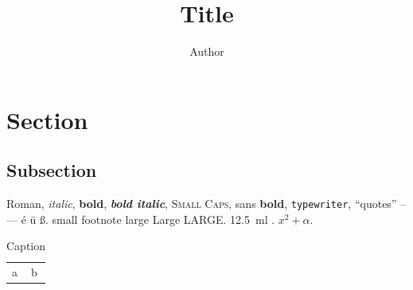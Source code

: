 \documentclass[11pt,a4paper]{article}
\title{Title}
\author{Author}
\begin{document}
\maketitle
\section{Section}\subsection{Subsection}
Roman, \textit{italic}, \textbf{bold}, \textbf{\textit{bold italic}}, \textsc{Small Caps},
\textsf{sans \textbf{bold}}, \texttt{typewriter}, ``quotes'' -- --- é ü ß.
{\small small} {\footnotesize footnote} {\large large} {\Large Large} {\LARGE LARGE}.
\SI{12.5}{\milli\litre} . $x^2 + \alpha$.
\begin{table}[h]\centering\caption{Caption}\begin{tabular}{ll}a&b\end{tabular}\end{table}
\end{document}

